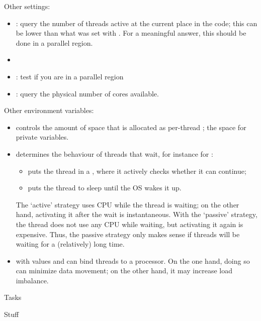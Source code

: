 Other settings:
\begin{itemize}
\item{}: query the number of threads
  active at the current place in the code; this can be lower than what
  was set with . For a meaningful answer, this
  should be done in a parallel region.
\item{}
\item{}: test if you are in a parallel region
\item{}: query the physical number of cores available.
\end{itemize}

Other environment variables:
\begin{itemize}
\item {} controls the amount of space that is
  allocated as per-thread ; the space for private
  variables.
\item {} determines the behaviour of
  threads that wait, for instance for :
  \begin{itemize}
  \item {} puts the thread in a , where
    it actively checks whether it can continue;
  \item {} puts the thread to sleep until the \ac{OS} wakes
    it up.
  \end{itemize}
  The `active' strategy uses CPU while the thread is waiting; on the
  other hand, activating it after the wait is instantaneous. With the
  `passive' strategy, the thread does not use any CPU while waiting,
  but activating it again is expensive. Thus, the passive strategy
  only makes sense if threads will be waiting for a (relatively) long
  time.
\item {} with values  and 
  can bind threads to a processor. On the one hand, doing so can
  minimize data movement; on the other hand, it may increase load
  imbalance.
\end{itemize}


 {Tasks}

 {Stuff}

